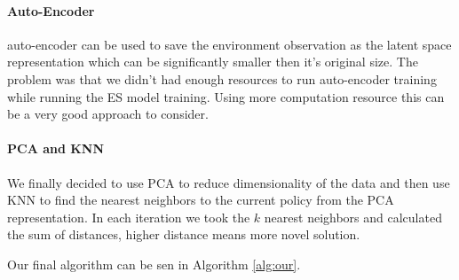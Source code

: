 \documentclass[11 pt, twocolumn]{article}
\begin{document}
\paragraph{Auto-Encoder}
auto-encoder can be used to save the environment observation as the latent space representation which can be significantly smaller then it's original size. The problem was that we didn't had enough resources to run auto-encoder training while running the ES model training. Using more computation resource this can be a very good approach to consider.
\paragraph{PCA and KNN}
We finally decided to use PCA to reduce dimensionality of the data and then use KNN to find the nearest neighbors to the current policy from the PCA representation. In each iteration we took the $k$ nearest neighbors and calculated the sum of distances, higher distance means more novel solution.


Our final algorithm can be sen in Algorithm \ref{alg:our}.
\end{document}
